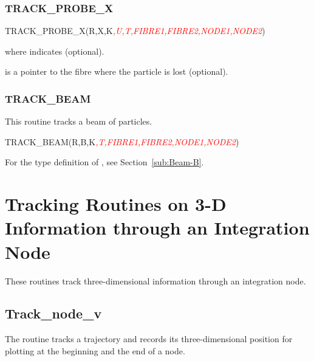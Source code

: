 \subsubsection{TRACK_PROBE_X}

%
\begin{ptccode}
TRACK_PROBE_X(R,X,K\textit{\textcolor{red}{,U,T,FIBRE1,FIBRE2,NODE1,NODE2}})
\end{ptccode}

 where  indicates  (optional).

 is a pointer to the fibre where the particle is lost (optional).


\subsubsection{TRACK_BEAM}

%
This routine tracks a beam of particles.

\begin{ptccode}
TRACK_BEAM(R,B,K\textit{\textcolor{red}{,T,FIBRE1,FIBRE2,NODE1,NODE2}})
\end{ptccode}

For the type definition of , see Section~\ref{sub:Beam-B}.


\section{Tracking Routines on 3-D Information through an Integration Node}

%
These routines track three-dimensional information through an integration node.


\subsection{Track_node_v}

%
The  routine tracks a trajectory and records its
three-dimensional position for plotting at the beginning and the end of a node.


